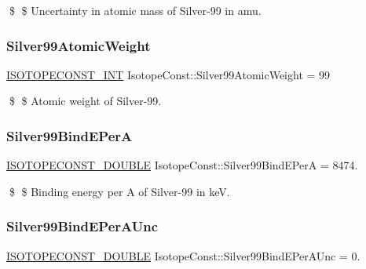 \$ \$ Uncertainty in atomic mass of Silver-\/99 in amu. \mbox{\label{group___isotope_const-_silver-_ag99_ga24c24490a1f1d30aab586ed5a4d047a7}} 
\subsubsection{\texorpdfstring{Silver99\+Atomic\+Weight}{Silver99AtomicWeight}}
{\footnotesize\ttfamily \mbox{\hyperlink{group___isotope_const-_macros_ga5f18360b3e99483a35c32d789e62621c}{I\+S\+O\+T\+O\+P\+E\+C\+O\+N\+S\+T\+\_\+\+I\+NT}} Isotope\+Const\+::\+Silver99\+Atomic\+Weight = 99}

\$ \$ Atomic weight of Silver-\/99. \mbox{\label{group___isotope_const-_silver-_ag99_gae600c8479af1afc71016d8355c645261}} 
\subsubsection{\texorpdfstring{Silver99\+Bind\+E\+PerA}{Silver99BindEPerA}}
{\footnotesize\ttfamily \mbox{\hyperlink{group___isotope_const-_macros_ga8f45a7272ce02c0b4c65c44636ed719a}{I\+S\+O\+T\+O\+P\+E\+C\+O\+N\+S\+T\+\_\+\+D\+O\+U\+B\+LE}} Isotope\+Const\+::\+Silver99\+Bind\+E\+PerA = 8474.}

\$ \$ Binding energy per A of Silver-\/99 in keV. \mbox{\label{group___isotope_const-_silver-_ag99_gacefb0caf1e31c8067af7b08019ad467d}} 
\subsubsection{\texorpdfstring{Silver99\+Bind\+E\+Per\+A\+Unc}{Silver99BindEPerAUnc}}
{\footnotesize\ttfamily \mbox{\hyperlink{group___isotope_const-_macros_ga8f45a7272ce02c0b4c65c44636ed719a}{I\+S\+O\+T\+O\+P\+E\+C\+O\+N\+S\+T\+\_\+\+D\+O\+U\+B\+LE}} Isotope\+Const\+::\+Silver99\+Bind\+E\+Per\+A\+Unc = 0.}

